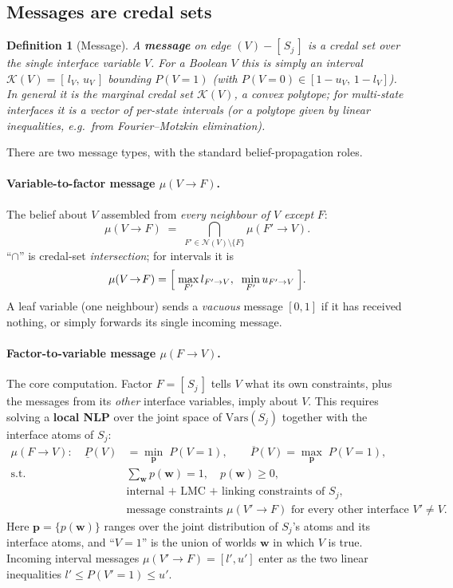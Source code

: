 \documentclass[11pt]{article}
\newtheorem{definition}{Definition}
\newcommand{\cK}{\mathcal{K}}
\newcommand{\cN}{\mathcal{N}}
\newcommand{\bp}{\mathbf{p}}
\newcommand{\lo}{\underline}
\newcommand{\hi}{\overline}
\newcommand{\Vars}{\mathrm{Vars}}
\begin{document}
\subsection{Messages are credal sets}

\begin{definition}[Message]
A \textbf{message} on edge $(V)\!-\![\,S_j\,]$ is a credal set over the single
interface variable $V$. For a Boolean $V$ this is simply an interval
$\cK(V) = [\,l_V,\,u_V\,]$ bounding $P(V{=}1)$ (with
$P(V{=}0)\in[1{-}u_V,\,1{-}l_V]$). In general it is the marginal credal set
$\cK(V)$, a convex polytope; for multi-state interfaces it is a vector of
per-state intervals (or a polytope given by linear inequalities, e.g.\ from
Fourier--Motzkin elimination).
\end{definition}

There are two message types, with the standard belief-propagation roles.

\paragraph{Variable-to-factor message $\mu(V\!\to\!F)$.}
The belief about $V$ assembled from \emph{every neighbour of $V$ except} $F$:
\begin{equation}\label{eq:v2f}
  \mu(V\!\to\!F) \;=\; \bigcap_{F'\in\cN(V)\setminus\{F\}} \mu(F'\!\to\!V).
\end{equation}
``$\cap$'' is credal-set \emph{intersection}; for intervals it is
\[
  \mu(V\!\to\!F) = \Bigl[\;\max_{F'} l_{F'\to V},\;\;
                          \min_{F'} u_{F'\to V}\;\Bigr].
\]
A leaf variable (one neighbour) sends a \emph{vacuous} message $[0,1]$ if it
has received nothing, or simply forwards its single incoming message.

\paragraph{Factor-to-variable message $\mu(F\!\to\!V)$.}
The core computation. Factor $F=[\,S_j\,]$ tells $V$ what its own constraints,
plus the messages from its \emph{other} interface variables, imply about $V$.
This requires solving a \textbf{local NLP} over the joint space of
$\Vars(S_j)$ together with the interface atoms of $S_j$:
\begin{equation}\label{eq:f2v}
\begin{aligned}
  \mu(F\!\to\!V):\quad
  \lo P(V) &= \min_{\bp}\; P(V{=}1), \qquad
  \hi P(V)  = \max_{\bp}\; P(V{=}1),\\
  \text{s.t.}\quad
  &\textstyle\sum_{\mathbf{w}} p(\mathbf{w}) = 1,\quad p(\mathbf{w})\ge 0,\\
  &\text{internal + LMC + linking constraints of } S_j,\\
  &\text{message constraints } \mu(V'\!\to\!F)
      \text{ for every other interface } V'\!\ne\!V .
\end{aligned}
\end{equation}
Here $\bp = \{p(\mathbf{w})\}$ ranges over the joint distribution of $S_j$'s
atoms and its interface atoms, and ``$V{=}1$'' is the union of worlds
$\mathbf{w}$ in which $V$ is true. Incoming interval messages
$\mu(V'\!\to\!F)=[l',u']$ enter as the two linear inequalities
$l'\le P(V'{=}1)\le u'$.
\end{document}
